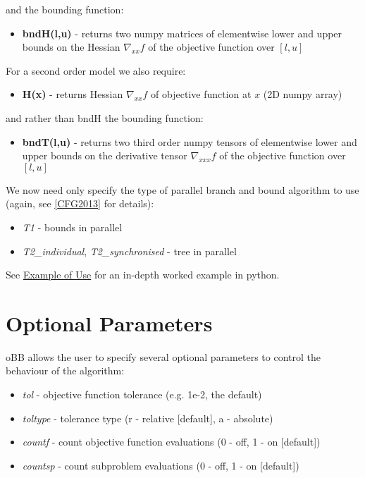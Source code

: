 \documentclass[letterpaper,11pt,openany,oneside]{sphinxmanual}
\begin{document}
and the bounding function:
\begin{itemize}
\item {} 
\textbf{bndH(l,u)} - returns two numpy matrices of elementwise lower and upper bounds on the Hessian $\nabla_{xx} f$ of the objective function over $[l,u]$

\end{itemize}

For a second order model we also require:
\begin{itemize}
\item {} 
\textbf{H(x)} - returns Hessian $\nabla_{xx} f$ of objective function at $x$ (2D numpy array)

\end{itemize}

and rather than bndH the bounding function:
\begin{itemize}
\item {} 
\textbf{bndT(l,u)} - returns two third order numpy tensors of elementwise lower and upper bounds on the derivative tensor $\nabla_{xxx} f$ of the objective function over $[l,u]$

\end{itemize}

We now need only specify the type of parallel branch and bound algorithm to use (again, see {\hyperref[userguide:cfg2013]{{[}CFG2013{]}}} for details):
\begin{itemize}
\item {} 
\emph{T1} - bounds in parallel

\item {} 
\emph{T2\_individual}, \emph{T2\_synchronised} - tree in parallel

\end{itemize}

See {\hyperref[userguide:example-of-use]{Example of Use}} for an in-depth worked example in python.


\section{Optional Parameters}
\label{userguide:optional-parameters}
oBB allows the user to specify several optional parameters to control the behaviour of the algorithm:
\begin{itemize}
\item {} 
\emph{tol} - objective function tolerance (e.g. 1e-2, the default)

\item {} 
\emph{toltype} - tolerance type (r - relative {[}default{]}, a - absolute)

\item {} 
\emph{countf} - count objective function evaluations (0 - off, 1 - on {[}default{]})

\item {} 
\emph{countsp} - count subproblem evaluations (0 - off, 1 - on {[}default{]})

\end{itemize}
\end{document}
